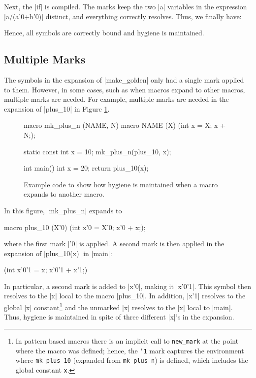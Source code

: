 Next, the |if| is compiled.  The marks keep the two |a| variables in
the expression |a/(a'0+b'0)| distinct, and everything correctly
resolves.  Thus, we finally have:


Hence, all symbols are correctly bound and hygiene is maintained.


\subsection{Multiple Marks}

The symbols in the expansion of |make_golden| only had a single mark
applied to them.  However, in some cases, such as when macros expand
to other macros, multiple marks are needed.
For example, multiple marks are needed in the expansion of |plus_10|
in Figure \ref{macro-macro}.  
\begin{figure}
\begin{codef}
macro mk_plus_n (NAME, N) {
  macro NAME (X) { ({int x = X; x + N;}); }
}

static const int x = 10;
mk_plus_n(plus_10, x);

int main() {
  int x = 20;
  return plus_10(x);
}
\end{codef}
\caption{Example code to show how hygiene is maintained when a macro
  expands to another macro.}
\label{macro-macro}
\end{figure}
In this figure, |mk_plus_n| expands to
\begin{code}
macro plus_10 (X'0) { ({int x'0 = X'0; x'0 + x;}); }
\end{code}
where the first mark |'0| is applied.  A second mark is then applied
in the expansion of |plus_10(x)| in |main|:
\begin{code}
{ ({int x'0'1 = x; x'0'1 + x'1;}) }
\end{code}
In particular, a second mark is added to |x'0|, making it |x'0'1|.
This symbol then resolves to the |x| local to the macro |plus_10|.  In
addition, |x'1| resolves to the global |x| constant\footnote{In pattern
based macros there is an implicit call to \texttt{new\_mark} at the point
where the macro was defined; hence, the \texttt{'1} mark captures the
environment where \texttt{mk\_plus\_10} (expanded from \texttt{mk\_plus\_n}) 
is defined, which includes the global
constant \texttt{x}.} and the unmarked |x| resolves to the |x| local to
|main|.  Thus, hygiene is maintained in spite of three different |x|'s
in the expansion.

